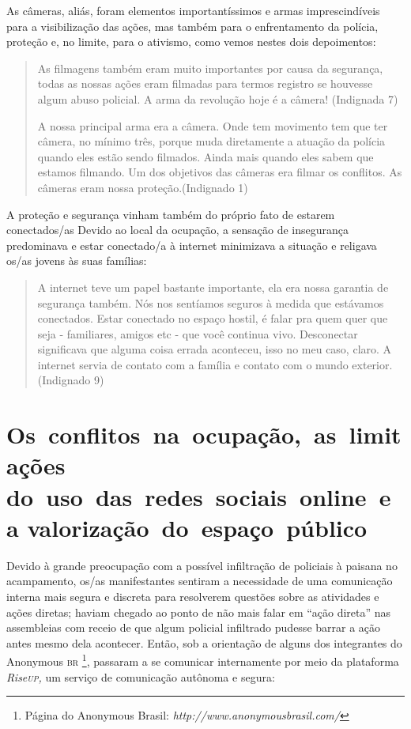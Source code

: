 As câmeras, aliás, foram elementos importantíssimos e armas
imprescindíveis para a visibilização das ações, mas também para o
enfrentamento da polícia, proteção e, no limite, para o ativismo, como
vemos nestes dois depoimentos:

\begin{quote}
As filmagens também eram muito importantes por causa da segurança, todas
as nossas ações eram filmadas para termos registro se houvesse algum
abuso policial. A arma da revolução hoje é a câmera! (Indignada 7)

A nossa principal arma era a câmera. Onde tem movimento tem que ter
câmera, no mínimo três, porque muda diretamente a atuação da polícia
quando eles estão sendo filmados. Ainda mais quando eles sabem que
estamos filmando. Um dos objetivos das câmeras era filmar os conflitos.
As câmeras eram nossa proteção.(Indignado 1)
\end{quote}

A proteção e segurança vinham também do próprio fato de estarem
conectados/as Devido ao local da ocupação, a sensação de insegurança
predominava e estar conectado/a à internet minimizava a situação e
religava os/as jovens às suas famílias:

\begin{quote}
A internet teve um papel bastante importante, ela era nossa garantia de
segurança também. Nós nos sentíamos seguros à medida que estávamos
conectados. Estar conectado no espaço hostil, é falar pra quem quer que
seja - familiares, amigos etc - que você continua vivo. Desconectar
significava que alguma coisa errada aconteceu, isso no meu caso, claro.
A internet servia de contato com a família e contato com o mundo
exterior. (Indignado 9)
\end{quote}

\section{Os~conflitos~na~ocupação,~as~limitações do~uso~das~redes~sociais~online~e~a valorização~do~espaço~público}

Devido à grande preocupação com a possível infiltração de policiais à
paisana no acampamento, os/as manifestantes sentiram a necessidade de
uma comunicação interna mais segura e discreta para resolverem questões
sobre as atividades e ações diretas; haviam chegado ao ponto de não mais
falar em ``ação direta'' nas assembleias com receio de que algum
policial infiltrado pudesse barrar a ação antes mesmo dela acontecer.
Então, sob a orientação de alguns dos integrantes do Anonymous \textsc{br}
\footnote{Página do Anonymous Brasil:
  \emph{http://www.anonymousbrasil.com/}}, passaram a se comunicar
internamente por meio da plataforma \emph{Rise\textsc{up},} um serviço de
comunicação autônoma e segura:

